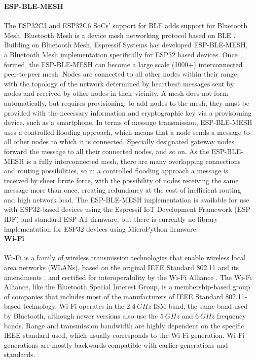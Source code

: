 \textbf{ESP-BLE-MESH}\\\\
The ESP32C3 and ESP32C6 SoCs' support for BLE adds support for Bluetooth Mesh. Bluetooth Mesh is a device mesh networking protocol based on BLE \citep{noauthor_bluetooth_2023, noauthor_bluetooth_2023-1}. Building on Bluetooth Mesh, Espressif Systems has developed ESP-BLE-MESH, a Bluetooth Mesh implementation specifically for ESP32 based devices.
Once formed, the ESP-BLE-MESH can become a large scale (1000+) interconnected peer-to-peer mesh. Nodes are connected to all other nodes within their range, with the topology of the network determined by heartbeat messages sent by nodes and received by other nodes in their vicinity. A mesh does not form automatically, but requires provisioning: to add nodes to the mesh, they must be provided with the necessary information and cryptographic key via a provisioning device, such as a smartphone.  
In terms of message transmission, ESP-BLE-MESH uses a controlled flooding approach, which means that a node sends a message to all other nodes to which it is connected. Specially designated gateway nodes forward the message to all their connected nodes, and so on. As the ESP-BLE-MESH is a fully interconnected mesh, there are many overlapping connections and routing possibilities, so in a controlled flooding approach a message is received by sheer brute force, with the possibility of nodes receiving the same message more than once, creating redundancy at the cost of inefficient routing and high network load. The ESP-BLE-MESH implementation is available for use with ESP32-based devices using the Espressif IoT Development Framework (ESP IDF) and standard ESP AT firmware, but there is currently no library implementation for ESP32 devices using MicroPython firmware. \citep{espressif_systems_esp-ble-mesh_nodate, noauthor_bluetooth_2023, noauthor_bluetooth_2023-1}\\

\textbf{Wi-Fi}\\\\
Wi-Fi is a family of wireless transmission technologies that enable wireless local area networks (WLANs), based on the original IEEE Standard 802.11 and its amendments \citep[][]{noauthor_ieee_2024-1}, and certified for interoperability by the Wi-Fi Alliance \citep{noauthor_certification_2020}. The Wi-Fi Alliance, like the Bluetooth Special Interest Group, is a membership-based group of companies that includes most of the manufacturers of IEEE Standard 802.11-based technology. \citep{noauthor_wi-fi_nodate} Wi-Fi operates in the $2.4\ GHz$ ISM band, the same band used by Bluetooth, although newer versions also use the $5\ GHz$ and $6\ GHz$ frequency bands. Range and transmission bandwidth are highly dependent on the specific IEEE standard used, which usually corresponds to the Wi-Fi generation. Wi-Fi generations are mostly backwards compatible with earlier generations and standards.

